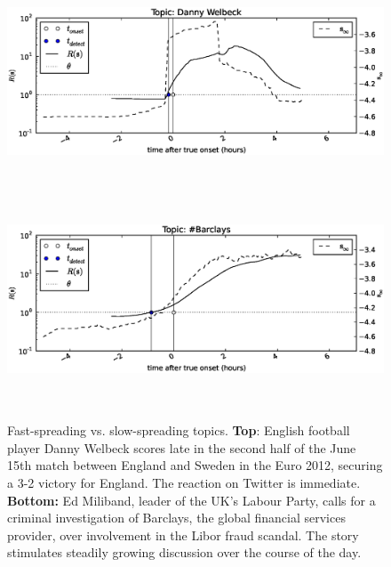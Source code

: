 \begin{figure}[!h]
\begin{center}
\includegraphics[height=2.5in]{../fig/final/detection_examples/danny_welbeck.eps}
\includegraphics[height=2.5in]{../fig/final/detection_examples/barclays.eps}
\end{center}
\caption{\label{fig:examples1} Fast-spreading vs. slow-spreading topics. {\bf
    Top}: English football player Danny Welbeck scores late in the second half
  of the June 15th match between England and Sweden in the Euro 2012, securing a
  3-2 victory for England. The reaction on Twitter is immediate. {\bf Bottom:}
  Ed Miliband, leader of the UK's Labour Party, calls for a criminal
  investigation of Barclays, the global financial services provider, over
  involvement in the Libor fraud scandal. The story stimulates steadily growing
  discussion over the course of the day.}
\end{figure}

